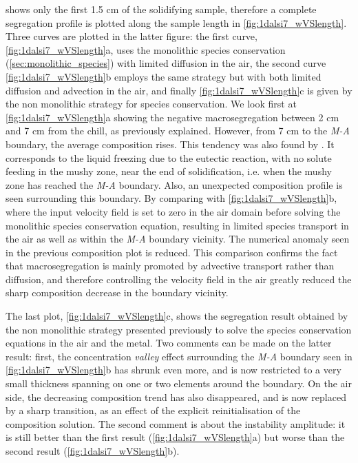 shows only the first 1.5 cm of the solidifying sample, therefore a complete segregation profile is plotted along the sample length in \cref{fig:1dalsi7_wVSlength}.
Three curves are plotted in the latter figure: the first curve, \cref{fig:1dalsi7_wVSlength}a, uses the monolithic species conservation (\cref{sec:monolithic_species})
with limited diffusion in the air, the second curve \cref{fig:1dalsi7_wVSlength}b employs the same strategy but with both limited diffusion and advection in the air, and
finally \cref{fig:1dalsi7_wVSlength}c is given by the non monolithic strategy for species conservation.
We look first at \cref{fig:1dalsi7_wVSlength}a showing the negative macrosegregation between 2 cm and 7 cm from the chill, as previously explained.
However, from 7 cm to the \emph{M-A} boundary, the average composition rises.
This tendency was also found by \citet{niane_etude_2004}. It corresponds to the liquid freezing due to the eutectic reaction, with no solute feeding in the mushy zone, 
near the end of solidification, i.e. when the mushy zone has reached the \emph{M-A} boundary.
Also, an unexpected composition profile is seen surrounding this boundary. 
By comparing with \cref{fig:1dalsi7_wVSlength}b, where the input velocity field is set to zero in the air domain before solving the monolithic species conservation equation,
resulting in limited species transport in the air as well as within the \emph{M-A} boundary vicinity. The numerical anomaly seen in the previous composition plot is reduced.
This comparison confirms the fact that macrosegregation is mainly promoted by advective transport rather than diffusion, and therefore controlling the velocity field in the air greatly reduced the sharp
composition decrease in the boundary vicinity.

The last plot, \cref{fig:1dalsi7_wVSlength}c, shows the segregation result obtained by the non monolithic strategy presented previously to solve the species conservation equations
in the air and the metal. Two comments can be made on the latter result: first, the concentration \emph{valley} effect surrounding the \emph{M-A} boundary seen in 
\cref{fig:1dalsi7_wVSlength}b has shrunk even more, and is now restricted to a very small thickness spanning on one or two elements around the boundary.
On the air side, the decreasing composition trend has also disappeared, and is now replaced by a sharp transition, as an effect of the explicit reinitialisation of 
the composition solution. The second comment is about the instability amplitude: it is still better than the first result (\cref{fig:1dalsi7_wVSlength}a) 
but worse than the second result (\cref{fig:1dalsi7_wVSlength}b).

